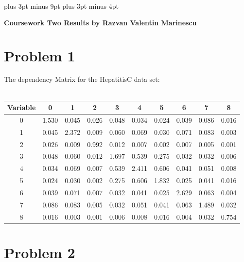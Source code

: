 \documentclass[11pt,a4paper,oneside]{report}
\begin{document}
\belowdisplayskip=12pt plus 3pt minus 9pt
\belowdisplayshortskip=7pt plus 3pt minus 4pt


\Large{\textbf{Coursework Two Results by Razvan Valentin Marinescu}}


\section*{Problem 1}

\begin{table}[H]
  \centering
  The dependency Matrix for the HepatitisC data set:\\
   \ \\
  \begin{tabular}{ c | c | c | c | c | c | c | c | c | c | }
    Variable & 0 & 1 & 2 & 3 & 4 & 5 & 6 & 7 & 8\\
    \hline
    0 & 1.530 & 0.045 & 0.026 & 0.048 & 0.034 & 0.024 & 0.039 & 0.086 & 0.016\\
    \hline
    1 & 0.045 & 2.372 & 0.009 & 0.060 & 0.069 & 0.030 & 0.071 & 0.083 & 0.003\\
    \hline
    2 & 0.026 & 0.009 & 0.992 & 0.012 & 0.007 & 0.002 & 0.007 & 0.005 & 0.001\\
    \hline
    3 & 0.048 & 0.060 & 0.012 & 1.697 & 0.539 & 0.275 & 0.032 & 0.032 & 0.006\\
    \hline
    4 & 0.034 & 0.069 & 0.007 & 0.539 & 2.411 & 0.606 & 0.041 & 0.051 & 0.008\\
    \hline
    5 & 0.024 & 0.030 & 0.002 & 0.275 & 0.606 & 1.832 & 0.025 & 0.041 & 0.016\\
    \hline
    6 & 0.039 & 0.071 & 0.007 & 0.032 & 0.041 & 0.025 & 2.629 & 0.063 & 0.004\\
    \hline
    7 & 0.086 & 0.083 & 0.005 & 0.032 & 0.051 & 0.041 & 0.063 & 1.489 & 0.032\\
    \hline
    8 & 0.016 & 0.003 & 0.001 & 0.006 & 0.008 & 0.016 & 0.004 & 0.032 & 0.754\\
    \hline
  \end{tabular}
\end{table}


\section*{Problem 2}
\end{document}
